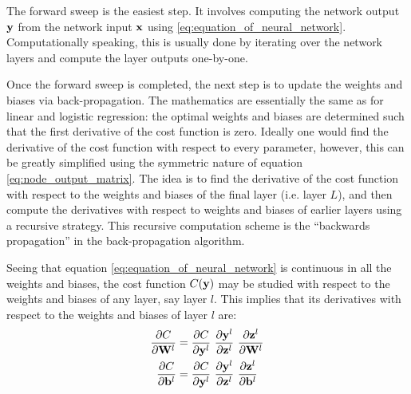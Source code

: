 \documentclass[nofootinbib,reprint,english]{revtex4-1}
\newcommand{\W}{\vb{W}}
\begin{document}
The forward sweep is the easiest step. It involves computing the network output \(\vb{y}\) from the network input \(\vb{x}\) using \eqref{eq:equation_of_neural_network}. Computationally speaking, this is usually done by iterating over the network layers and compute the layer outputs one-by-one.

Once the forward sweep is completed, the next step is to update the weights and biases via back-propagation. The mathematics are essentially the same as for linear and logistic regression: the optimal weights and biases are determined such that the first derivative of the cost function is zero. Ideally one would find the derivative of the cost function with respect to every parameter, however, this can be greatly simplified using the symmetric nature of equation \eqref{eq:node_output_matrix}. The idea is to find the derivative of the cost function with respect to the weights and biases of the final layer (i.e. layer \(L\)), and then compute the derivatives with respect to weights and biases of earlier layers using a recursive strategy. This recursive computation scheme is the ``backwards propagation'' in the back-propagation algorithm.

Seeing that equation \eqref{eq:equation_of_neural_network} is continuous in all the weights and biases, the cost function \(C(\vb{y})\) may be studied with respect to the weights and biases of any layer, say layer \(l\). This implies that its derivatives with respect to the weights and biases of layer \(l\) are:
\begin{subequations}\label{eq:nerual_network_chain_derivatives}
\begin{align}
\pdv{C}{\W^l}&=\pdv{C}{\vb{y}^l}\ \pdv{\vb{y}^l}{\vb{z}^l}\ \pdv{\vb{z}^l}{\W^l}\\
\pdv{C}{\vb{b}^l}&=\pdv{C}{\vb{y}^l}\ \pdv{\vb{y}^l}{\vb{z}^l}\ \pdv{\vb{z}^l}{\vb{b}^l}
\end{align}
\end{subequations}
\end{document}
